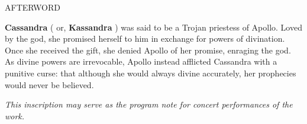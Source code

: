 \documentclass[11pt]{article}
\begin{document}
\vspace*{10\baselineskip}

\begingroup
\begin{center}
\huge AFTERWORD
\end{center}
\endgroup

\vspace*{3\baselineskip}

\begingroup
\textbf{Cassandra} ( or, \textbf{Kassandra} ) was said to be a Trojan priestess of Apollo. Loved by the god, she promised herself to him in exchange for powers of divination. Once she received the gift, she denied Apollo of her promise, enraging the god. As divine powers are irrevocable, Apollo instead afflicted Cassandra with a punitive curse: that although she would always divine accurately, her prophecies would never be believed. 	
\endgroup

\vspace*{20\baselineskip}

\begingroup
\begin{center}
\textit{This inscription may serve as the program note for concert performances of the work.}	
\end{center}
\endgroup
\end{document}
